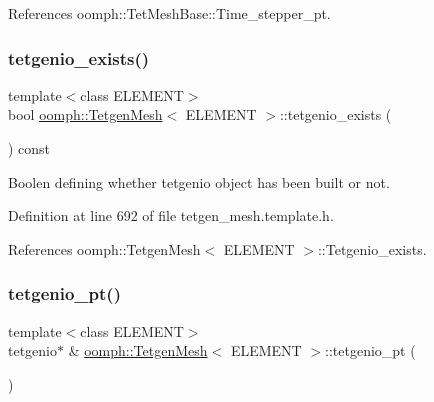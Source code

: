 References oomph\+::\+Tet\+Mesh\+Base\+::\+Time\+\_\+stepper\+\_\+pt.

\mbox{\label{classoomph_1_1TetgenMesh_aeab19209f141e65511a52f195d89d6ac}} 
\subsubsection{\texorpdfstring{tetgenio\+\_\+exists()}{tetgenio\_exists()}}
{\footnotesize\ttfamily template$<$class E\+L\+E\+M\+E\+NT$>$ \\
bool \hyperlink{classoomph_1_1TetgenMesh}{oomph\+::\+Tetgen\+Mesh}$<$ E\+L\+E\+M\+E\+NT $>$\+::tetgenio\+\_\+exists (\begin{DoxyParamCaption}{ }\end{DoxyParamCaption}) const\hspace{0.3cm}{\ttfamily [inline]}}



Boolen defining whether tetgenio object has been built or not. 



Definition at line 692 of file tetgen\+\_\+mesh.\+template.\+h.



References oomph\+::\+Tetgen\+Mesh$<$ E\+L\+E\+M\+E\+N\+T $>$\+::\+Tetgenio\+\_\+exists.

\mbox{\label{classoomph_1_1TetgenMesh_a47071bb8a8c0df965a5e013f0a8fb1ba}} 
\subsubsection{\texorpdfstring{tetgenio\+\_\+pt()}{tetgenio\_pt()}}
{\footnotesize\ttfamily template$<$class E\+L\+E\+M\+E\+NT$>$ \\
tetgenio$\ast$ \& \hyperlink{classoomph_1_1TetgenMesh}{oomph\+::\+Tetgen\+Mesh}$<$ E\+L\+E\+M\+E\+NT $>$\+::tetgenio\+\_\+pt (\begin{DoxyParamCaption}{ }\end{DoxyParamCaption})\hspace{0.3cm}{\ttfamily [inline]}}



